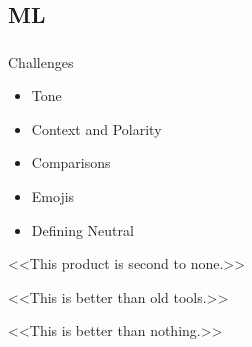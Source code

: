\documentclass[t, 11pt]{beamer}
\begin{document}
\subsection{ML}
\begin{frame}
	\frametitle{\insertsection}
	\frametitle{\insertsubsection}  
Challenges
	\begin{itemize}
		\item Tone
		\item Context and Polarity
		\item Comparisons  
		\item Emojis
		\item Defining Neutral	
	\end{itemize}

<<This product is second to none.>>

<<This is better than old tools.>>

<<This is better than nothing.>>
	
\end{frame}





%
%  

%	
%	
%	
%	
%	
%	
%	



%	
%	
\end{document}
